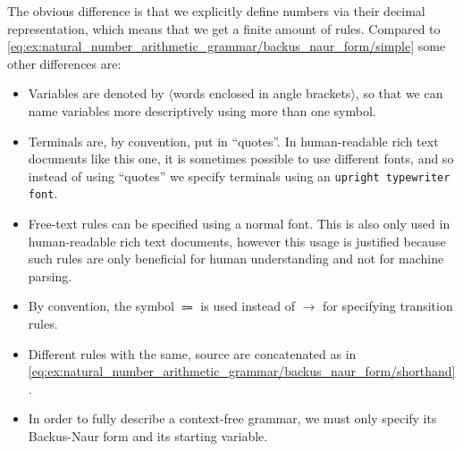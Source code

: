 \begin{remark}
  The obvious difference is that we explicitly define numbers via their decimal representation, which means that we get a finite amount of rules. Compared to \eqref{eq:ex:natural_number_arithmetic_grammar/backus_naur_form/simple} some other differences are:
  \begin{itemize}
    \item Variables are denoted by \( \langle \)words enclosed in angle brackets\( \rangle \), so that we can name variables more descriptively using more than one symbol.
    \item Terminals are, by convention, put in \enquote{quotes}. In human-readable rich text documents like this one, it is sometimes possible to use different fonts, and so instead of using \enquote{quotes} we specify terminals using an \texttt{upright typewriter font}.
    \item Free-text rules can be specified using a normal font. This is also only used in human-readable rich text documents, however this usage is justified because such rules are only beneficial for human understanding and not for machine parsing.
    \item By convention, the symbol \( \Coloneqq \) is used instead of \( \to \) for specifying transition rules.
    \item Different rules with the same, source are concatenated as in \eqref{eq:ex:natural_number_arithmetic_grammar/backus_naur_form/shorthand}.
    \item In order to fully describe a context-free grammar, we must only specify its Backus-Naur form and its starting variable.
  \end{itemize}
\end{remark}

